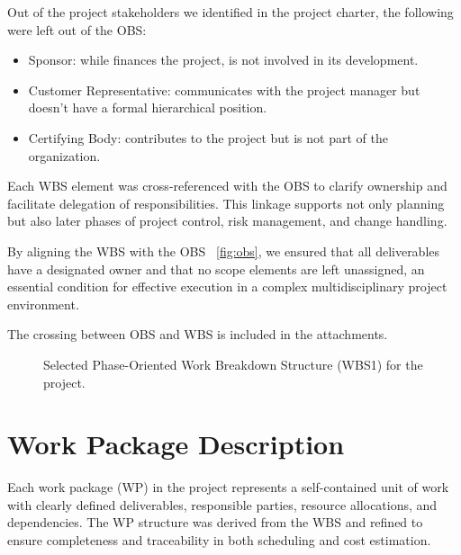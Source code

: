 Out of the project stakeholders we identified in the project charter, the following were left out of the OBS:
\begin{itemize}
    \item Sponsor: while finances the project, is not involved in its development.
    \item Customer Representative: communicates with the project manager but doesn't have a formal hierarchical position.
    \item Certifying Body: contributes to the project but is not part of the organization.
\end{itemize}

Each WBS element was cross-referenced with the OBS to clarify ownership and facilitate delegation of responsibilities. This linkage supports not only planning but also later phases of project control, risk management, and change handling.

By aligning the WBS with the OBS ~\ref{fig:obs}, we ensured that all deliverables have a designated owner and that no scope elements are left unassigned, an essential condition for effective execution in a complex multidisciplinary project environment.

The crossing between OBS and WBS is included in the attachments.

\begin{figure}[p]
    \centering
    \caption{Selected Phase-Oriented Work Breakdown Structure (WBS1) for the project.}
    \label{fig:wbs1}
\end{figure}

\section{Work Package Description}

Each work package (WP) in the project represents a self-contained unit of work with clearly defined deliverables, responsible parties, resource allocations, and dependencies. The WP structure was derived from the WBS and refined to ensure completeness and traceability in both scheduling and cost estimation.

